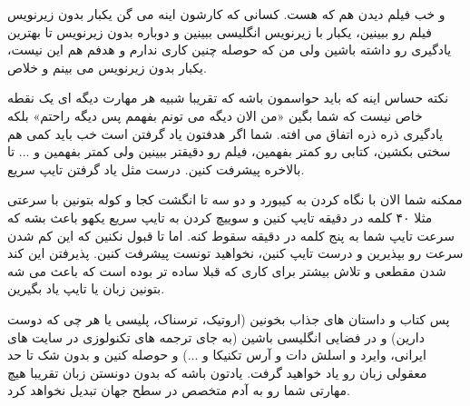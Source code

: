 و خب فیلم دیدن هم که هست. کسانی که کارشون اینه می گن یکبار بدون زیرنویس فیلم رو ببینین، یکبار با زیرنویس انگلیسی ببینین و دوباره بدون زیرنویس تا بهترین یادگیری رو داشته باشین ولی من که حوصله چنین کاری ندارم و هدفم هم این نیست، یکبار بدون زیرنویس می بینم و خلاص.

نکته حساس اینه که باید حواسمون باشه که تقریبا شبیه هر مهارت دیگه ای یک نقطه خاص نیست که شما بگین «من الان دیگه می تونم بفهمم پس دیگه راحتم» بلکه یادگیری ذره ذره اتفاق می افته. شما اگر هدفتون یاد گرفتن است خب باید کمی هم سختی بکشین، کتابی رو کمتر بفهمین، فیلم رو دقیقتر ببینین ولی کمتر بفهمین و ... تا بالاخره پیشرفت کنین. درست مثل یاد گرفتن تایپ سریع. 

ممکنه شما الان با نگاه کردن به کیبورد و دو سه تا انگشت کجا و کوله بتونین با سرعتی مثلا ۴۰ کلمه در دقیقه تایپ کنین و سوییچ کردن به تایپ سریع یکهو باعث بشه که سرعت تایپ شما به پنج کلمه در دقیقه سقوط کنه. اما تا قبول نکنین که این کم شدن سرعت رو بپذیرین و درست تایپ کنین، نخواهید تونست پیشرفت کنین. پذیرفتن این کند شدن مقطعی و تلاش بیشتر برای کاری که قبلا ساده تر بوده است که باعث می شه بتونین زبان یا تایپ یاد بگیرین.

پس کتاب و داستان های جذاب بخونین (اروتیک، ترسناک، پلیسی یا هر چی که دوست دارین)‌ و در فضایی انگلیسی باشین (به جای ترجمه های تکنولوزی در سایت های ایرانی، وایرد
 و اسلش دات
 و آرس تکنیکا
و ...) و حوصله کنین و بدون شک تا حد معقولی زبان رو یاد خواهید گرفت. یادتون باشه که بدون دونستن زبان تقریبا هیچ مهارتی شما رو به آدم متخصص در سطح جهان تبدیل نخواهد کرد.

